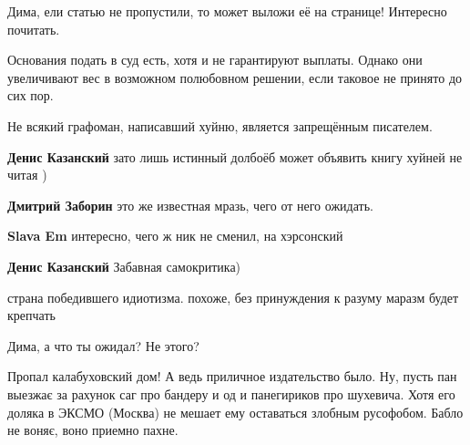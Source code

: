 \begin{itemize}
\begin{itemize}
\end{itemize} %

Дима, ели статью не пропустили, то может выложи её на странице! Интересно почитать.


Основания подать в суд есть, хотя и не гарантируют выплаты. Однако они
увеличивают вес в возможном полюбовном решении, если таковое не принято до сих
пор.


Не всякий графоман, написавший хуйню, является запрещённым писателем.

\begin{itemize} %
\textbf{Денис Казанский} зато лишь истинный долбоёб может объявить книгу хуйней не читая )

\textbf{Дмитрий Заборин} это же известная мразь, чего от него ожидать.

\textbf{Slava Em} интересно, чего ж ник не сменил, на хэрсонский

\textbf{Денис Казанский} Забавная самокритика)
\end{itemize} %

страна победившего идиотизма. похоже, без принуждения к разуму маразм будет крепчать

Дима, а что ты ожидал? Не этого?


\obeycr
Пропал калабуховский дом!
А ведь приличное издательство было.
Ну, пусть пан выезжає за рахунок саг про бандеру и од и панегириков про шухевича.
Хотя его доляка в ЭКСМО (Москва) не мешает ему оставаться злобным русофобом.
Бабло не воняє, воно приемно пахне.
\restorecr

\end{itemize} %

